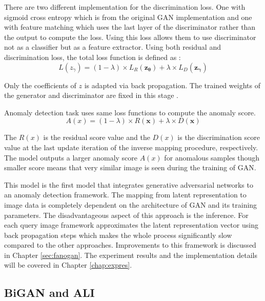 {There are two different implementation for the discrimination loss. One with sigmoid cross entropy
which is from the original GAN implementation \cite{Goodfellow:2014:GAN:2969033.2969125} and one
with feature matching \cite{fm} which uses the last layer of the discriminator rather than the
output to compute the loss. Using this loss allows them to use discriminator not as a classifier but
as a feature extractor. Using both residual and discrimination loss, the total loss function is
defined as :
$$L(z_{\gamma}) = (1 - \lambda ) \times L_{R}(\boldsymbol{z_{\theta}}) + \lambda \times
L_{D}(\boldsymbol{z_{\gamma}})$$

Only the coefficients of $z$ is adapted via back propagation. The trained weights of the generator
and discriminator are fixed in this stage \cite{Schlegl2017UnsupervisedAD}.

Anomaly detection task uses same loss functions to compute the anomaly score. 
$$A(x) = (1 - \lambda ) \times R(\boldsymbol{x}) + \lambda \times D(\boldsymbol{x}) $$

The $R(x)$ is the residual score value and the $D(x)$ is the discrimination score value at the last
update iteration of the inverse mapping procedure, respectively. The model outputs a larger anomaly
score $A(x)$ for anomalous samples though smaller score means that very similar image is seen during
the training of GAN. 

This model is the first model that integrates generative adversarial networks to an anomaly
detection framework. The mapping from latent representation to image data is completely dependent on
the architecture of GAN and its training parameters. The disadvantageous aspect of this approach
is the inference. For each query image framework approximates the latent representation vector using
back propagation steps which makes the whole process significantly slow compared to the other
approaches. Improvements to this framework is discussed in  Chapter
\ref{sec:fanogan}. The experiment results and the implementation details will be covered in
Chapter \ref{chap:expres}.

\subsection{BiGAN and ALI}
\label{sec:bigan}

}
